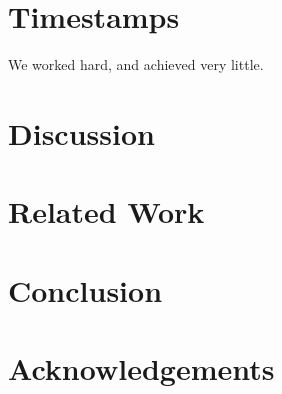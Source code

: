 \documentclass[10pt, twocolumn]{article}
\begin{document}
\section{Timestamps}
\label{sec:timestamps}
We worked hard, and achieved very little.

\section{Discussion}
\label{sec:discuss}

\section{Related Work}
\label{sec:related}

\section{Conclusion}
\label{sec:conc}

\section{Acknowledgements}
\label{sec:ack}



\end{document}
